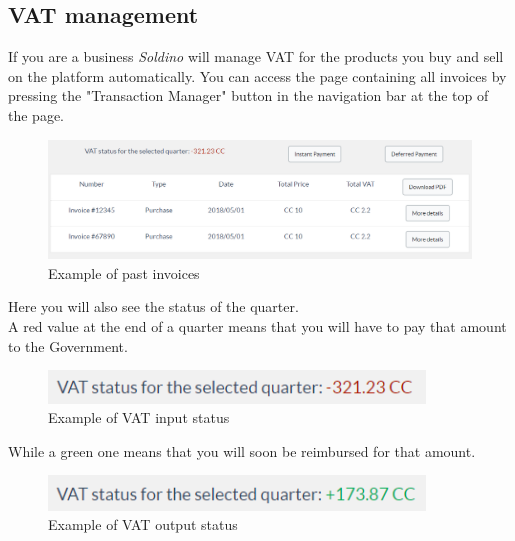 	\subsection{VAT management}
	If you are a business \textit{Soldino} will manage VAT for the products 
	you buy and sell on the platform automatically. You can access the page 
	containing all invoices by pressing the "Transaction Manager" button 
	in the navigation bar at the top of the page.
	\begin{figure}[H]
		\includegraphics[width=15cm]{res/images/past_invoices.png}
		\centering
		\caption{Example of past invoices}
	\end{figure}
	\noindent Here you will also see the status of the quarter. 
	\\A red value at the end of a quarter means that you will have to pay 
	that amount to the Government.
	\begin{figure}[H]
		\includegraphics[width=10cm]{res/images/negative_vat_status.png}
		\centering
		\caption{Example of VAT input status}
	\end{figure}
	\noindent While a green one means that you will 
	soon be reimbursed for that amount.
	\begin{figure}[H]
		\includegraphics[width=10cm]{res/images/positive_vat_status.png}
		\centering
		\caption{Example of VAT output status}
	\end{figure}
